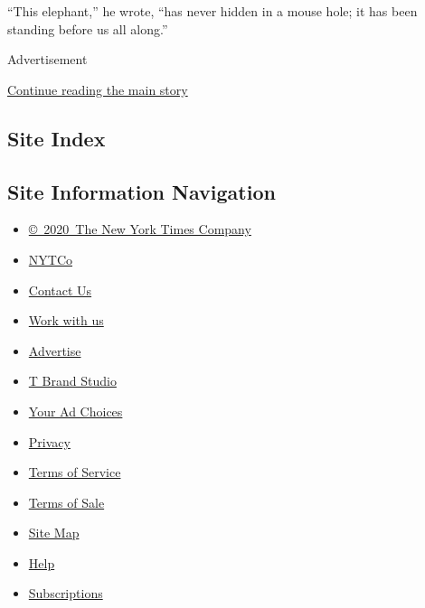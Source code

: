 ``This elephant,'' he wrote, ``has never hidden in a mouse hole; it has
been standing before us all along.''

Advertisement

\protect\hyperlink{after-bottom}{Continue reading the main story}

\hypertarget{site-index}{%
\subsection{Site Index}\label{site-index}}

\hypertarget{site-information-navigation}{%
\subsection{Site Information
Navigation}\label{site-information-navigation}}

\begin{itemize}
\tightlist
\item
  \href{https://help.nytimes3xbfgragh.onion/hc/en-us/articles/115014792127-Copyright-notice}{©~2020~The
  New York Times Company}
\end{itemize}

\begin{itemize}
\tightlist
\item
  \href{https://www.nytco.com/}{NYTCo}
\item
  \href{https://help.nytimes3xbfgragh.onion/hc/en-us/articles/115015385887-Contact-Us}{Contact
  Us}
\item
  \href{https://www.nytco.com/careers/}{Work with us}
\item
  \href{https://nytmediakit.com/}{Advertise}
\item
  \href{http://www.tbrandstudio.com/}{T Brand Studio}
\item
  \href{https://www.nytimes3xbfgragh.onion/privacy/cookie-policy\#how-do-i-manage-trackers}{Your
  Ad Choices}
\item
  \href{https://www.nytimes3xbfgragh.onion/privacy}{Privacy}
\item
  \href{https://help.nytimes3xbfgragh.onion/hc/en-us/articles/115014893428-Terms-of-service}{Terms
  of Service}
\item
  \href{https://help.nytimes3xbfgragh.onion/hc/en-us/articles/115014893968-Terms-of-sale}{Terms
  of Sale}
\item
  \href{https://spiderbites.nytimes3xbfgragh.onion}{Site Map}
\item
  \href{https://help.nytimes3xbfgragh.onion/hc/en-us}{Help}
\item
  \href{https://www.nytimes3xbfgragh.onion/subscription?campaignId=37WXW}{Subscriptions}
\end{itemize}
